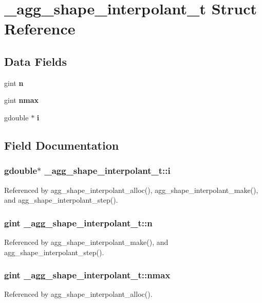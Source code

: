 \section{\+\_\+agg\+\_\+shape\+\_\+interpolant\+\_\+t Struct Reference}
\label{struct__agg__shape__interpolant__t}
\subsection*{Data Fields}
\begin{DoxyCompactItemize}
\item 
gint {\bf n}
\item 
gint {\bf nmax}
\item 
gdouble $\ast$ {\bf i}
\end{DoxyCompactItemize}


\subsection{Field Documentation}
\subsubsection[{i}]{\setlength{\rightskip}{0pt plus 5cm}gdouble$\ast$ \+\_\+agg\+\_\+shape\+\_\+interpolant\+\_\+t\+::i}\label{struct__agg__shape__interpolant__t_af2444e2891b7344fb10e6cd0b9d5f753}


Referenced by agg\+\_\+shape\+\_\+interpolant\+\_\+alloc(), agg\+\_\+shape\+\_\+interpolant\+\_\+make(), and agg\+\_\+shape\+\_\+interpolant\+\_\+step().

\subsubsection[{n}]{\setlength{\rightskip}{0pt plus 5cm}gint \+\_\+agg\+\_\+shape\+\_\+interpolant\+\_\+t\+::n}\label{struct__agg__shape__interpolant__t_aa766310e12e583a9942f50c2dc0ab4d8}


Referenced by agg\+\_\+shape\+\_\+interpolant\+\_\+make(), and agg\+\_\+shape\+\_\+interpolant\+\_\+step().

\subsubsection[{nmax}]{\setlength{\rightskip}{0pt plus 5cm}gint \+\_\+agg\+\_\+shape\+\_\+interpolant\+\_\+t\+::nmax}\label{struct__agg__shape__interpolant__t_a9b3d9c32686b4003686bccaaef98e976}


Referenced by agg\+\_\+shape\+\_\+interpolant\+\_\+alloc().


